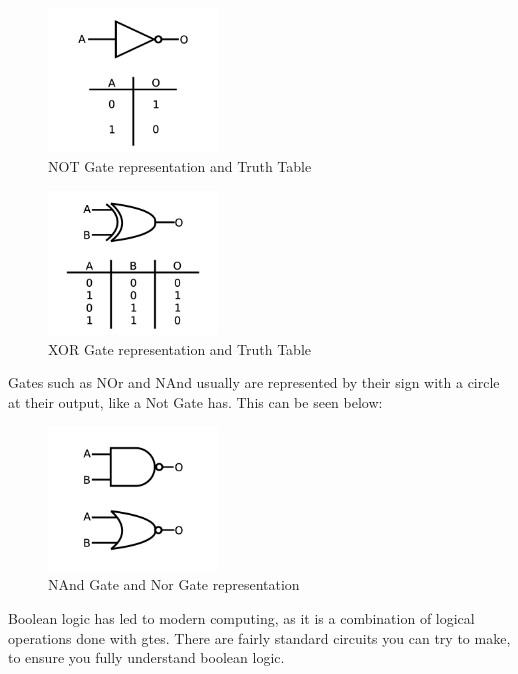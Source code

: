 \documentclass[a4paper,11pt]{report}
\begin{document}
\begin{figure}[H]
\centering
\includegraphics[width=0.4\textwidth]{notgate1}
\caption{NOT Gate representation and Truth Table}
\end{figure}

\begin{figure}[H]
\centering
\includegraphics[width=0.4\textwidth]{xorgate1}
\caption{XOR Gate representation and Truth Table}
\end{figure}

Gates such as NOr and NAnd usually are represented by their sign with a circle at their output, like a Not Gate has. This can be seen below:

\begin{figure}[H]
\centering
\includegraphics[width=0.4\textwidth]{nandnor}
\caption{NAnd Gate and Nor Gate representation}
\end{figure}

Boolean logic has led to modern computing, as it is a combination of logical operations done with \gls{gte}s. There are fairly standard circuits you can try to make, to ensure you fully understand boolean logic.
\end{document}
